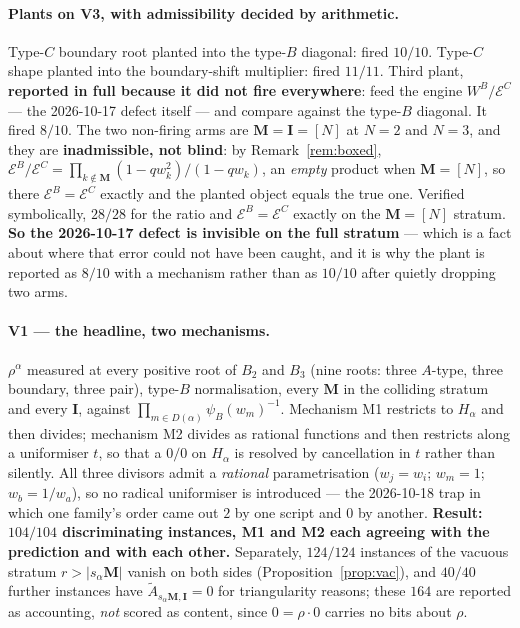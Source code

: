 \documentclass[11pt]{article}
\theoremstyle{definition}
\newcommand{\At}{\widetilde{A}}
\newcommand{\bM}{\mathbf{M}}
\newcommand{\bI}{\mathbf{I}}
\newcommand{\EB}{\mathcal{E}^{B}}
\newcommand{\EC}{\mathcal{E}^{C}}
\begin{document}
\paragraph{Plants on V3, with admissibility decided by arithmetic.}
Type-$C$ boundary root planted into the type-$B$ diagonal: fired $10/10$.
Type-$C$ shape planted into the boundary-shift multiplier: fired $11/11$.
Third plant, \textbf{reported in full because it did not fire everywhere}: feed
the engine $W^{B}/\EC$ --- the 2026-10-17 defect itself --- and compare against
the type-$B$ diagonal.  It fired $8/10$.  The two non-firing arms are
$\bM=\bI=[N]$ at $N=2$ and $N=3$, and they are \textbf{inadmissible, not
blind}: by Remark~\ref{rem:boxed}, $\EB/\EC=\prod_{k\notin\bM}
(1-qw_k^{2})/(1-qw_k)$, an \emph{empty} product when $\bM=[N]$, so there
$\EB=\EC$ exactly and the planted object equals the true one.  Verified
symbolically, $28/28$ for the ratio and $\EB=\EC$ exactly on the $\bM=[N]$
stratum.  \textbf{So the 2026-10-17 defect is invisible on the full stratum} ---
which is a fact about where that error could not have been caught, and it is
why the plant is reported as $8/10$ with a mechanism rather than as $10/10$
after quietly dropping two arms.

\paragraph{V1 --- the headline, two mechanisms.}  $\rho^{\alpha}$ measured at
every positive root of $B_2$ and $B_3$ (nine roots: three $A$-type, three
boundary, three pair), type-$B$ normalisation, every $\bM$ in the colliding
stratum and every $\bI$, against $\prod_{m\in D(\alpha)}\psi_B(w_m)^{-1}$.
Mechanism M1 restricts to $H_\alpha$ and then divides; mechanism M2 divides as
rational functions and then restricts along a uniformiser $t$, so that a $0/0$
on $H_\alpha$ is resolved by cancellation in $t$ rather than silently.  All
three divisors admit a \emph{rational} parametrisation ($w_j=w_i$; $w_m=1$;
$w_b=1/w_a$), so no radical uniformiser is introduced --- the 2026-10-18 trap in
which one family's order came out $2$ by one script and $0$ by another.
\textbf{Result: $104/104$ discriminating instances, M1 and M2 each agreeing with
the prediction and with each other.}  Separately, $124/124$ instances of the
vacuous stratum $r>|s_\alpha\bM|$ vanish on both sides
(Proposition~\ref{prop:vac}), and $40/40$ further instances have
$\At_{s_\alpha\bM,\bI}=0$ for triangularity reasons; these $164$ are reported as
accounting, \emph{not} scored as content, since $0=\rho\cdot0$ carries no bits
about $\rho$.
\end{document}
